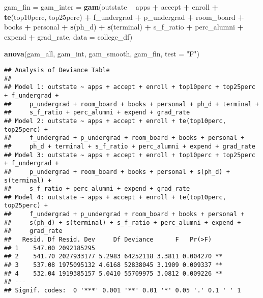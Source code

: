 \documentclass[
]{article}
\newenvironment{Shaded}{\begin{snugshade}}{\end{snugshade}}
\newcommand{\DataTypeTok}[1]{\textcolor[rgb]{0.13,0.29,0.53}{#1}}
\newcommand{\KeywordTok}[1]{\textcolor[rgb]{0.13,0.29,0.53}{\textbf{#1}}}
\newcommand{\NormalTok}[1]{#1}
\newcommand{\OperatorTok}[1]{\textcolor[rgb]{0.81,0.36,0.00}{\textbf{#1}}}
\newcommand{\StringTok}[1]{\textcolor[rgb]{0.31,0.60,0.02}{#1}}
\begin{document}
\begin{Shaded}
\begin{Highlighting}[]
\NormalTok{gam_fin =}\StringTok{ }\NormalTok{gam_inter =}\StringTok{ }\KeywordTok{gam}\NormalTok{(outstate }\OperatorTok{~}\StringTok{ }\NormalTok{apps }\OperatorTok{+}\StringTok{ }\NormalTok{accept }\OperatorTok{+}\StringTok{ }\NormalTok{enroll }\OperatorTok{+}\StringTok{ }\KeywordTok{te}\NormalTok{(top10perc, top25perc) }\OperatorTok{+}\StringTok{ }\NormalTok{f_undergrad }\OperatorTok{+}\StringTok{ }\NormalTok{p_undergrad }\OperatorTok{+}\StringTok{ }\NormalTok{room_board }\OperatorTok{+}\StringTok{ }\NormalTok{books }\OperatorTok{+}\StringTok{ }\NormalTok{personal }\OperatorTok{+}\StringTok{ }\KeywordTok{s}\NormalTok{(ph_d) }\OperatorTok{+}\StringTok{ }\KeywordTok{s}\NormalTok{(terminal) }\OperatorTok{+}\StringTok{ }\NormalTok{s_f_ratio }\OperatorTok{+}\StringTok{ }\NormalTok{perc_alumni }\OperatorTok{+}\StringTok{ }\NormalTok{expend }\OperatorTok{+}\StringTok{ }\NormalTok{grad_rate, }\DataTypeTok{data =}\NormalTok{ college_df)}

\KeywordTok{anova}\NormalTok{(gam_all, gam_int, gam_smooth, gam_fin, }\DataTypeTok{test =} \StringTok{"F"}\NormalTok{)}
\end{Highlighting}
\end{Shaded}

\begin{verbatim}
## Analysis of Deviance Table
## 
## Model 1: outstate ~ apps + accept + enroll + top10perc + top25perc + f_undergrad + 
##     p_undergrad + room_board + books + personal + ph_d + terminal + 
##     s_f_ratio + perc_alumni + expend + grad_rate
## Model 2: outstate ~ apps + accept + enroll + te(top10perc, top25perc) + 
##     f_undergrad + p_undergrad + room_board + books + personal + 
##     ph_d + terminal + s_f_ratio + perc_alumni + expend + grad_rate
## Model 3: outstate ~ apps + accept + enroll + top10perc + top25perc + f_undergrad + 
##     p_undergrad + room_board + books + personal + s(ph_d) + s(terminal) + 
##     s_f_ratio + perc_alumni + expend + grad_rate
## Model 4: outstate ~ apps + accept + enroll + te(top10perc, top25perc) + 
##     f_undergrad + p_undergrad + room_board + books + personal + 
##     s(ph_d) + s(terminal) + s_f_ratio + perc_alumni + expend + 
##     grad_rate
##   Resid. Df Resid. Dev     Df Deviance      F   Pr(>F)   
## 1    547.00 2092185295                                   
## 2    541.70 2027933177 5.2983 64252118 3.3811 0.004270 **
## 3    537.08 1975095132 4.6168 52838045 3.1909 0.009337 **
## 4    532.04 1919385157 5.0410 55709975 3.0812 0.009226 **
## ---
## Signif. codes:  0 '***' 0.001 '**' 0.01 '*' 0.05 '.' 0.1 ' ' 1
\end{verbatim}
\end{document}
